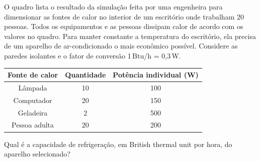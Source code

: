 O quadro lista o resultado da simulação feita por uma engenheira para dimensionar as fontes de calor no interior de um escritório onde trabalham 20 pessoas. Todos os equipamentos e as pessoas dissipam calor de acordo com os valores no quadro. Para manter constante a temperatura do escritório, ela precisa de um aparelho de ar-condicionado o mais econômico possível. Considere as paredes isolantes e o fator de conversão 1\,Btu/h = 0,3\,W.\par
\begin{center}\renewcommand{\arraystretch}{1.15}
\begin{tabular}{ccc}
\toprule
\textbf{Fonte de calor} & \textbf{Quantidade} & \textbf{Potência individual (W)}\\
\midrule
Lâmpada & 10 & 100\\
Computador & 20 & 150\\
Geladeira & 2 & 500\\
Pessoa adulta & 20 & 200\\
\bottomrule
\end{tabular}\end{center}
Qual é a capacidade de refrigeração, em British thermal unit por hora, do aparelho selecionado?\par
\begin{altlinha}
%
%
%
%
\end{altlinha}
